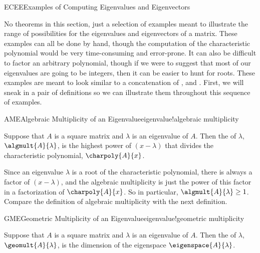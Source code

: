 \begin{subsect}{ECEE}{Examples of Computing Eigenvalues and Eigenvectors}
%
\begin{para}No theorems in this section, just a selection of examples meant to illustrate the range of possibilities for the eigenvalues and eigenvectors of a matrix.  These examples can all be done by hand, though the computation of the characteristic polynomial would be very time-consuming and error-prone.  It can also be difficult to factor an arbitrary polynomial, though if we were to suggest that most of our eigenvalues are going to be integers, then it can be easier to hunt for roots.  These examples are meant to look similar to a concatenation of ,  and .  First, we will sneak in a pair of definitions so we can illustrate them throughout this sequence of examples.\end{para}
%
\begin{definition}{AME}{Algebraic Multiplicity of an Eigenvalue}{eigenvalue!algebraic multiplicity}
\begin{para}Suppose that $A$ is a square matrix and $\lambda$ is an eigenvalue of $A$.  Then the  of $\lambda$, $\algmult{A}{\lambda}$, is the highest power of $(x-\lambda)$ that divides the characteristic polynomial, $\charpoly{A}{x}$.\end{para}
\end{definition}
%
\begin{para}Since an eigenvalue $\lambda$ is a root of the characteristic polynomial, there is always a factor of $(x-\lambda)$, and the algebraic multiplicity is just the power of this factor in a factorization of $\charpoly{A}{x}$.  So in particular, $\algmult{A}{\lambda}\geq 1$.  Compare the definition of algebraic multiplicity with the next definition.\end{para}
%
\begin{definition}{GME}{Geometric Multiplicity of an Eigenvalue}{eigenvalue!geometric multiplicity}
\begin{para}Suppose that $A$ is a square matrix and $\lambda$ is an eigenvalue of $A$.  Then the  of $\lambda$, $\geomult{A}{\lambda}$, is the dimension of the eigenspace $\eigenspace{A}{\lambda}$.\end{para}

\end{definition}
\end{subsect}
